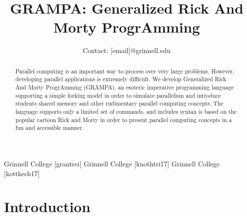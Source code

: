 \documentclass[numbers]{sigplanconf}
\begin{document}
\setlength{\pdfpageheight}{\paperheight}
\setlength{\pdfpagewidth}{\paperwidth}

\allowdisplaybreaks



\title{GRAMPA: Generalized Rick And Morty ProgrAmming}
\subtitle{Contact: [email]@grinnell.edu}

           {Grinnell College}
           {[grantrei]}
           {Grinnell College}
           {[knothtri17]}
           {Grinnell College}
           {[kottkech17]}

\maketitle

\begin{abstract}
Parallel computing is an important way to process over very large problems. However, developing parallel applications is extremely difficult. We develop Generalized Rick And Morty ProgrAmming (GRAMPA), an esoteric imperative programming language supporting a simple forking model in order to simulate parallelism and introduce students shared memory and other rudimentary parallel computing concepts. The language supports only a limited set of commands, and includes syntax is based on the popular cartoon Rick and Morty in order to present parallel computing concepts in a fun and accessible manner.
\end{abstract}

\section{Introduction}
\end{document}
